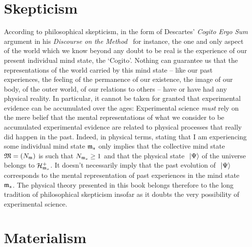 \documentclass[10pt,a4paper,twoside,openany]{book}
\begin{document}
\section{Skepticism}

According to philosophical skepticism, in the form of Descartes' \textit{Cogito Ergo Sum} argument in his \textit{Discourse on the Method}~\cite{Descartes1637} for instance, the one and only aspect of the world which we know beyond any doubt to be real is the experience of our present individual mind state, the `Cogito'. Nothing can guarantee us that the representations of the world carried by this mind state -- like our past experiences, the feeling of the permanence of our existence, the image of our body, of the outer world, of our relations to others -- have or have had any physical reality. In particular, it cannot be taken for granted that experimental evidence can be accumulated over the ages: Experimental science \textit{must} rely on the mere belief that the mental representations of what we consider to be accumulated experimental evidence are related to physical processes that really did happen in the past. Indeed, in physical terms, stating that I am experiencing some individual mind state $\mathfrak{m}_s$ only implies that the collective mind state $\mathfrak{M} = ({N}_{\mathfrak{m}})$ is such that ${N}_{\mathfrak{m}_s} \geq 1$ and that the physical state $\ \left|{\Psi}\right\rangle$ of the universe belongs to $\mathcal H_{\mathfrak{m}_s}^+$. It doesn't necessarily imply that the past evolution of $\ \left|{\Psi}\right\rangle$ corresponds to the mental representation of past experiences in the mind state $\mathfrak{m}_s$. The physical theory presented in this book belongs therefore to the long tradition of philosophical skepticism insofar as it doubts the very possibility of experimental science.




\section{Materialism}
\end{document}
